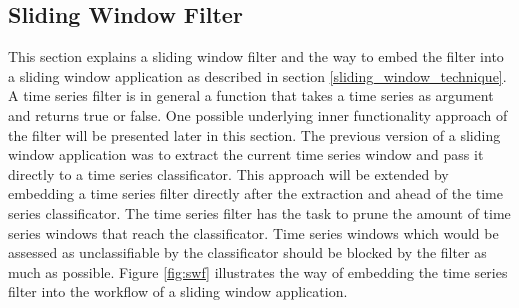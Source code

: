 \subsection{Sliding Window Filter} \label{sliding_window_filter}
This section explains a sliding window filter and the way to embed the filter into a sliding window application as
described in section \ref{sliding_window_technique}. A time series filter is in general a function that takes a time
series as argument and returns true or false. One possible underlying inner functionality approach of the filter will be
presented later in this section. The previous version of a sliding window application was to extract the current time
series window and pass it directly to a time series classificator. This approach will be extended by embedding a time
series filter directly after the extraction and ahead of the time series classificator. The time series filter has the
task to prune the amount of time series windows that reach the classificator. Time series windows which would be
assessed as unclassifiable by the classificator should be blocked by the filter as much as possible. Figure
\ref{fig:swf} illustrates the way of embedding the time series filter into the workflow of a sliding window application.

